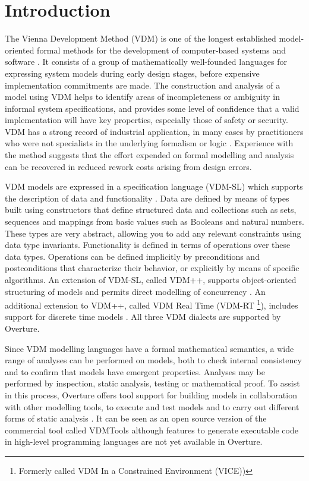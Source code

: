 \documentclass{overturerepchap}
\begin{document}
\chapter{Introduction}

The Vienna Development Method (VDM) is one of the longest established
model-oriented formal methods for the development of computer-based
systems and software
\cite{Bjorner&78,Jones90a,Fitzgerald&08c}. It consists of a
group of mathematically well-founded languages for expressing system
models during early design stages, before expensive implementation
commitments are made. The construction and analysis of a model using
VDM helps to identify areas of incompleteness or ambiguity in
informal system specifications, and provides some level of confidence
that a valid implementation will have key properties, especially those
of safety or security. VDM has a strong record of industrial
application, in many cases by practitioners who were not specialists in
the underlying formalism or logic
\cite{Larsen&95b,Clement&99,Kurita&09}. Experience with the method
suggests that the effort expended on formal modelling and analysis can
be recovered in reduced rework costs arising from design errors.

VDM models are expressed in a specification language (VDM-SL) which
supports the description of data and functionality
\cite{ISOVDM96a,Fitzgerald&98b,Fitzgerald&09}. Data are defined by
means of types built using constructors that define structured data
and collections such as sets, sequences and mappings from basic values
such as Booleans and natural numbers. These types are very abstract,
allowing you to add any relevant constraints using data type
invariants. Functionality is defined in terms of operations over these
data types. Operations can be defined implicitly by preconditions and
postconditions that characterize their behavior, or explicitly by
means of specific algorithms. An extension of VDM-SL, called VDM++,
supports object-oriented structuring of models and permits direct
modelling of concurrency \cite{Fitzgerald&05}. An additional extension
to VDM++, called VDM Real Time (VDM-RT \footnote{Formerly called VDM In a
Constrained Environment (VICE))}), includes support for discrete
time models \cite{Mukherjee&00,Verhoef&06b}. All
three VDM dialects are supported by Overture.

Since VDM modelling languages have a formal mathematical semantics,
a wide range of analyses can be performed on models, both to check
internal consistency and to confirm that models have emergent
properties. Analyses may be performed by inspection, static analysis,
testing or mathematical proof. To assist in this process, Overture
offers tool support for building models in collaboration with other
modelling tools, to execute and test models and to carry out different
forms of static analysis \cite{Larsen&10a}. It can be seen as an open
source version of the commercial tool called VDMTools
\cite{Elmstrom&94,Larsen01,Fitzgerald&08a} although features to
generate executable code in high-level programming languages are
not yet available in Overture.
\end{document}
